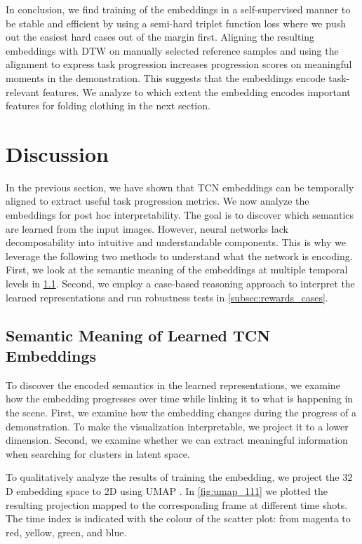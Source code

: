 \documentclass[\home/main.tex]{subfiles}
\begin{document}
In conclusion, we find training of the embeddings in a self-supervised manner to be stable and efficient by using a semi-hard triplet function loss where we push out the easiest hard cases out of the margin first. Aligning the resulting embeddings with DTW on manually selected reference samples and using the alignment to express task progression increases progression scores on meaningful moments in the demonstration. This suggests that the embeddings encode task-relevant features. We analyze to which extent the embedding encodes important features for folding clothing in the next section.


\section{Discussion}\label{sec:rewards_discuss}
In the previous section, we have shown that TCN embeddings can be temporally aligned to extract useful task progression metrics. We now analyze the embeddings for post hoc interpretability. The goal is to discover which semantics are learned from the input images. However, neural networks lack decomposability into intuitive and understandable components. This is why we leverage the following two methods to understand what the network is encoding. First, we look at the semantic meaning of the embeddings at multiple temporal levels in \cref{subsec:semantic meaning}. Second, we employ a case-based reasoning approach to interpret the learned representations and run robustness tests in \cref{subsec:rewards_cases}.

\subsection{Semantic Meaning of Learned TCN Embeddings}\label{subsec:semantic meaning}
To discover the encoded semantics in the learned representations, we examine how the embedding progresses over time while linking it to what is happening in the scene. First, we examine how the embedding changes during the progress of a demonstration. To make the visualization interpretable, we project it to a lower dimension. Second, we examine whether we can extract meaningful information when searching for clusters in latent space.

To qualitatively analyze the results of training the embedding, we project the $32$D embedding space to $2$D using UMAP \autocite{UMAP}. In \cref{fig:umap_111} we plotted the resulting projection mapped to the corresponding frame at different time shots. The time index is indicated with the colour of the scatter plot: from magenta to red, yellow, green, and blue.
\end{document}
